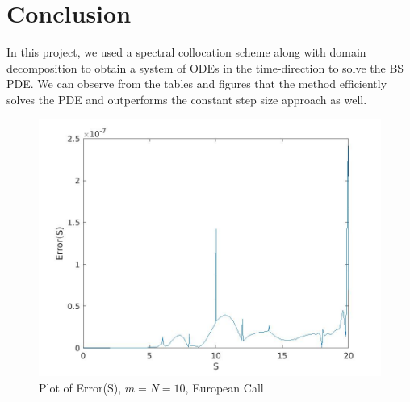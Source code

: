 \documentclass[a4paper,12pt]{article}
\begin{document}
\newpage

\section{Conclusion}

In this project, we used a spectral collocation scheme along with domain decomposition to obtain a system of ODEs in the time-direction to solve the BS PDE. We can observe from the tables and figures that the method efficiently solves the PDE and outperforms the constant step size approach as well.


\begin{figure}[p]
        \centering
        \includegraphics[width = \linewidth]{err_eur.jpg}
        \caption{Plot of Error(S), $m=N=10$, European Call}
        \label{fig:q}
\end{figure}
\end{document}

